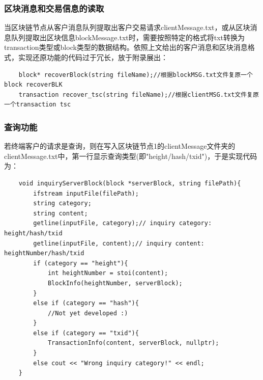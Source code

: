 \documentclass[10pt,a4paper]{article}
\begin{document}
    \subsubsection{区块消息和交易信息的读取}
    当区块链节点从客户消息队列提取出客户交易请求clientMessage.txt，或从区块消息队列提取出区块信息blockMessage.txt时，需要按照特定的格式将txt转换为transaction类型或block类型的数据结构。依照上文给出的客户消息和区块消息格式，实现还原功能的代码过于冗长，放于附录展出：
    \begin{verbatim}
    block* recoverBlock(string fileName);//根据blockMSG.txt文件复原一个block recoverBLK
    transaction recover_tsc(string fileName);//根据clientMSG.txt文件复原一个transaction tsc
    \end{verbatim}
    \subsubsection{查询功能}
    若终端客户的请求是查询，则在写入区块链节点1的clientMessage文件夹的clientMessage.txt中，第一行显示查询类型(即"height/hash/txid")，于是实现代码为：
    \begin{verbatim}
    void inquiryServerBlock(block *serverBlock, string filePath){
        ifstream inputFile(filePath);
        string category;
        string content;
        getline(inputFile, category);// inquiry category: height/hash/txid
        getline(inputFile, content);// inquiry content: heightNumber/hash/txid
        if (category == "height"){
            int heightNumber = stoi(content);
            BlockInfo(heightNumber, serverBlock);
        }
        else if (category == "hash"){
            //Not yet developed :)
        }
        else if (category == "txid"){
            TransactionInfo(content, serverBlock, nullptr);
        }
        else cout << "Wrong inquiry category!" << endl;
    }
    \end{verbatim}
\end{document}
